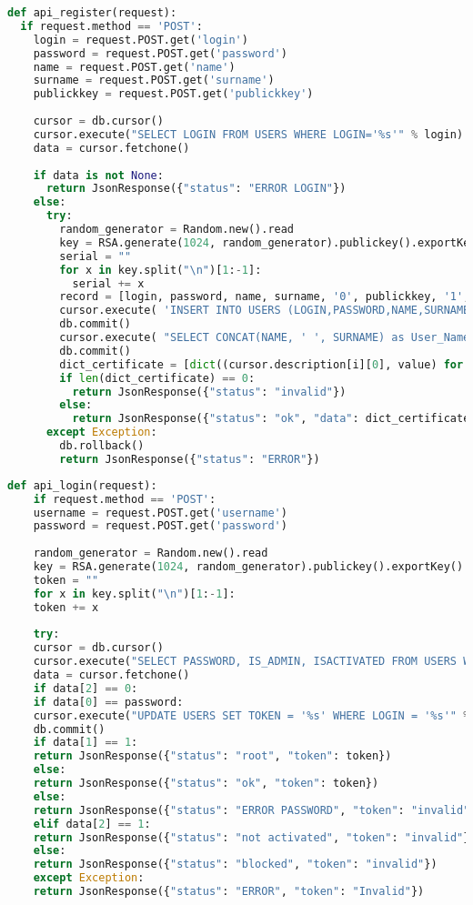 {\footnotesize
\begin{lstlisting}[caption={API rejestracji}, label={lst:serwer register}, language=Python]	
def api_register(request):
  if request.method == 'POST':
    login = request.POST.get('login')
    password = request.POST.get('password')
    name = request.POST.get('name')
    surname = request.POST.get('surname')
    publickkey = request.POST.get('publickkey')
    
    cursor = db.cursor()
    cursor.execute("SELECT LOGIN FROM USERS WHERE LOGIN='%s'" % login)
    data = cursor.fetchone()
    
    if data is not None:
      return JsonResponse({"status": "ERROR LOGIN"})
    else:
      try:
        random_generator = Random.new().read
        key = RSA.generate(1024, random_generator).publickey().exportKey()
        serial = ""
        for x in key.split("\n")[1:-1]:
          serial += x
        record = [login, password, name, surname, '0', publickkey, '1', serial, datetime.now().replace(year=datetime.now().year + 1)]
        cursor.execute( 'INSERT INTO USERS (LOGIN,PASSWORD,NAME,SURNAME,IS_ADMIN,PUBLIC_KEY, ISACTIVATED, Serial_number, Validitiy_period) VALUES(%s,%s,%s,%s,%s,%s,%s,%s,%s)', record)
        db.commit()
        cursor.execute( "SELECT CONCAT(NAME, ' ', SURNAME) as User_Name, LOGIN as Issuer_name,  PUBLIC_KEY, Serial_number, Validitiy_period, Version, Signature_Algorithm_Identifier, Hash_Algorithm FROM `users` WHERE `LOGIN` = '%s'" % (login))
        db.commit()
        dict_certificate = [dict((cursor.description[i][0], value) for i, value in enumerate(row)) for row in cursor.fetchall()]
        if len(dict_certificate) == 0:
          return JsonResponse({"status": "invalid"})
        else:
          return JsonResponse({"status": "ok", "data": dict_certificate})
      except Exception:
        db.rollback()
        return JsonResponse({"status": "ERROR"})
\end{lstlisting}}
\newpage
{\footnotesize 
	\begin{lstlisting}[caption={API logowania}, label={lst:serwer login}, language=Python]	
	def api_login(request):
	if request.method == 'POST':
	username = request.POST.get('username')
	password = request.POST.get('password')
	
	random_generator = Random.new().read
	key = RSA.generate(1024, random_generator).publickey().exportKey()
	token = ""
	for x in key.split("\n")[1:-1]:
	token += x
	
	try:
	cursor = db.cursor()
	cursor.execute("SELECT PASSWORD, IS_ADMIN, ISACTIVATED FROM USERS WHERE login='%s'" % username)
	data = cursor.fetchone()
	if data[2] == 0:
	if data[0] == password:
	cursor.execute("UPDATE USERS SET TOKEN = '%s' WHERE LOGIN = '%s'" % (token, username))
	db.commit()
	if data[1] == 1:
	return JsonResponse({"status": "root", "token": token})
	else:
	return JsonResponse({"status": "ok", "token": token})
	else:
	return JsonResponse({"status": "ERROR PASSWORD", "token": "invalid"})
	elif data[2] == 1:
	return JsonResponse({"status": "not activated", "token": "invalid"})
	else:
	return JsonResponse({"status": "blocked", "token": "invalid"})
	except Exception:
	return JsonResponse({"status": "ERROR", "token": "Invalid"})
	\end{lstlisting}}

